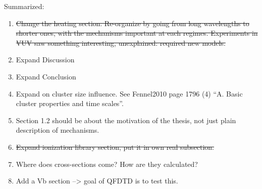 Summarized:
\begin{enumerate}
\item \sout{Change the heating section. Re-organize by going from long wavelengths to
      shorter ones, with the mechanisms important at each regimes. Experiments
      in VUV saw something interesting, unexplained: required new models.}
\item Expand Discussion
\item Expand Conclusion
\item Expand on cluster size influence. See Fennel2010\cite{Fennel2010} page 1796 (4)
      ``A. Basic cluster properties and time scales''.
\item Section 1.2 should be about the motivation of the thesis, not just plain
      description of mechanisms.
\item \sout{Expand ionization library section, put it in own real subsection.}
\item Where
      does cross-sections come? How are they calculated?
\item Add a Vb section --> goal of QFDTD is to test this.
\end{enumerate}


\newpage
{}
{}
\listoffixmes
